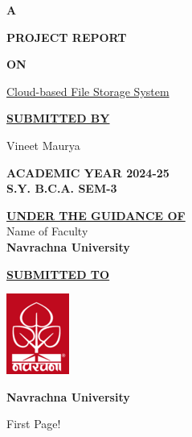 \documentclass[a4paper]{report}
\begin{document}
\afterpage{\restorepagecolor}
\begin{titlepage}
    \onehalfspacing
    \setlength{\baselineskip}{18pt}
    \color{white}
    \begin{center}
        \textbf{\LARGE{A\\ }}

        \textbf{\LARGE{PROJECT REPORT}}

        \textbf{\LARGE{ON}}

        \Large{\underline{Cloud-based File Storage System}}
        \vspace{1cm}

        \textbf{\underline{SUBMITTED BY}}

        Vineet Maurya
        \vspace{1cm}

        \textbf{ACADEMIC YEAR 2024-25\\
            S.Y. B.C.A. SEM-3}
        \vspace{1cm}

        \textbf{\underline{UNDER THE GUIDANCE OF}}\\
        Name of Faculty\\
        \textbf{Navrachna University}
        \vspace{1cm}

        \textbf{\underline{SUBMITTED TO}}
        \vspace{0.5cm}

        \includegraphics{nuv_logo.png}
        \vspace{0.5cm}

        \textbf{Navrachna University}
    \end{center}
\end{titlepage}
\newpage
First Page!
\end{document}
